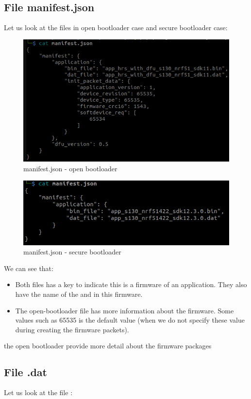 \documentclass{article}
\theoremstyle{plain}
\theoremstyle{definition}
\numberwithin{equation}{section}
\begin{document}
\subsection{File manifest.json}
Let us look at the files  in open bootloader case and secure bootloader case:
\begin{figure}[H]
	\centering
	\includegraphics[width=0.7\linewidth]{images/manifest-open}
	\caption{manifest.json - open bootloader}
	\label{fig:manifest-open}
\end{figure}
\begin{figure}[H]
	\centering
	\includegraphics[width=0.7\linewidth]{images/manifest-secure}
	\caption{manifest.json - secure bootloader}
	\label{fig:manifest-secure}
\end{figure}
We can see that:
\begin{itemize}
	\item Both files has a key to indicate this is a firmware of an application. They also have the name of the  and  in this firmware.
	\item The open-bootloader file has more information about the firmware. Some values such as 65535 is the default value (when we do not specify these value during creating the firmware packets).
\end{itemize}
the open bootloader provide more detail about the firmware packages

\subsection{File .dat}
Let us look at the file :
\end{document}
